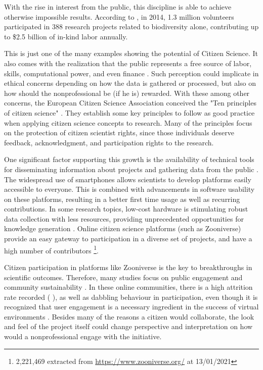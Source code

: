 With the rise in interest from the public, this discipline is able to achieve otherwise impossible results. According to \cite{theobald2015global}, in 2014, 1.3 million volunteers participated in 388 research projects related to biodiversity alone, contributing up to \$2.5 billion of in-kind labor annually.

This is just one of the many examples showing the potential of Citizen Science. It also comes with the realization that the public represents a free source of labor, skills, computational power, and even finance \cite{silvertown2009new}. Such perception could implicate in ethical concerns depending on how the data is gathered or processed, but also on how should the nonprofessional be (if he is) rewarded. With these among other concerns, the European Citizen Science Association conceived the "Ten principles of citizen science" \cite{robinson2018ten}. They establish some key principles to follow as good practice when applying citizen science concepts to research. Many of the principles focus on the protection of citizen scientist rights, since those individuals deserve feedback, acknowledgment, and participation rights to the research.

One significant factor supporting this growth is the availability of technical tools for disseminating information about projects and gathering data from the public \cite{silvertown2009new}. The widespread use of smartphones allows scientists to develop platforms easily accessible to everyone. This is combined with advancements in software usability on these platforms, resulting in a better first time usage as well as recurring contributions. In some research topics, low-cost hardware is stimulating robust data collection with less resources, providing unprecedented opportunities for knowledge generation \cite{buytaert2014citizen}. Online citizen science platforms (such as Zooniverse) provide an easy gateway to participation in a diverse set of projects, and have a high number of contributors \footnote{2,221,469 extracted from \url{https://www.zooniverse.org/} at 13/01/2021}.

Citizen participation in platforms like Zooniverse is the key to breakthroughs in scientific outcomes. Therefore, many studies focus on public engagement and community sustainability \cite{aristeidou2017profiles}. In these online communities, there is a high attrition rate recorded (\cite{nov2011technology} \cite{ponciano2015finding}), as well as dabbling behaviour \cite{eveleigh2014designing} in participation, even though it is recognized that user engagement is a necessary ingredient in the success of virtual environments \cite{verhagen2015benefitting}. Besides many of the reasons a citizen would collaborate, the look and feel of the project itself could change perspective and interpretation on how would a nonprofessional engage with the initiative.

